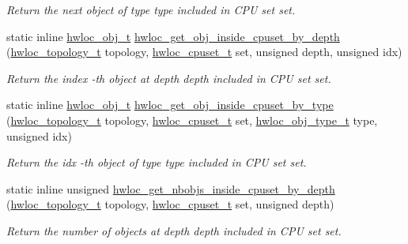 \begin{DoxyCompactItemize}
\begin{DoxyCompactList}\small\item\em Return the next object of type {\ttfamily type} included in CPU set {\ttfamily set}. \item\end{DoxyCompactList}\item 
static inline \hyperlink{structhwloc__obj}{hwloc\_\-obj\_\-t} \hyperlink{group__hwlocality__helper__find__inside_gad9b35f0fb89f3bb90edb11c35e7d5683}{hwloc\_\-get\_\-obj\_\-inside\_\-cpuset\_\-by\_\-depth} (\hyperlink{group__hwlocality__topology_ga9d1e76ee15a7dee158b786c30b6a6e38}{hwloc\_\-topology\_\-t} topology, \hyperlink{group__hwlocality__cpuset_ga7366332f7090f5b54d4b25a0c2c4b411}{hwloc\_\-cpuset\_\-t} set, unsigned depth, unsigned idx)
\begin{DoxyCompactList}\small\item\em Return the {\ttfamily index} -\/th object at depth {\ttfamily depth} included in CPU set {\ttfamily set}. \item\end{DoxyCompactList}\item 
static inline \hyperlink{structhwloc__obj}{hwloc\_\-obj\_\-t} \hyperlink{group__hwlocality__helper__find__inside_gafcb8f93a01a688d7772332b3ce543f6a}{hwloc\_\-get\_\-obj\_\-inside\_\-cpuset\_\-by\_\-type} (\hyperlink{group__hwlocality__topology_ga9d1e76ee15a7dee158b786c30b6a6e38}{hwloc\_\-topology\_\-t} topology, \hyperlink{group__hwlocality__cpuset_ga7366332f7090f5b54d4b25a0c2c4b411}{hwloc\_\-cpuset\_\-t} set, \hyperlink{group__hwlocality__types_gacd37bb612667dc437d66bfb175a8dc55}{hwloc\_\-obj\_\-type\_\-t} type, unsigned idx)
\begin{DoxyCompactList}\small\item\em Return the {\ttfamily idx} -\/th object of type {\ttfamily type} included in CPU set {\ttfamily set}. \item\end{DoxyCompactList}\item 
static inline unsigned \hyperlink{group__hwlocality__helper__find__inside_gace5af1ea003c8269566b6726fade7b32}{hwloc\_\-get\_\-nbobjs\_\-inside\_\-cpuset\_\-by\_\-depth} (\hyperlink{group__hwlocality__topology_ga9d1e76ee15a7dee158b786c30b6a6e38}{hwloc\_\-topology\_\-t} topology, \hyperlink{group__hwlocality__cpuset_ga7366332f7090f5b54d4b25a0c2c4b411}{hwloc\_\-cpuset\_\-t} set, unsigned depth)
\begin{DoxyCompactList}\small\item\em Return the number of objects at depth {\ttfamily depth} included in CPU set {\ttfamily set}. \item\end{DoxyCompactList}\item 

\end{DoxyCompactItemize}
